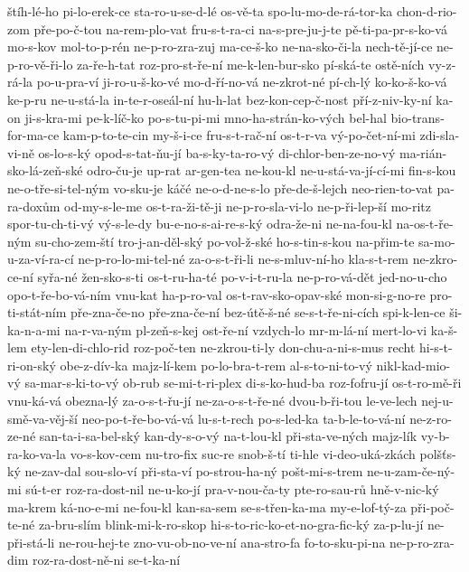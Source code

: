 štíh-lé-ho
pi-lo-erek-ce
sta-ro-u-se-d-lé
os-vě-ta
spo-lu-mo-de-rá-tor-ka
chon-d-rio-zom
pře-po-č-tou
na-rem-plo-vat
fru-s-t-ra-ci
na-s-pre-ju-j-te
pě-ti-pa-pr-s-ko-vá
mo-s-kov
mol-to-p-rén
ne-p-ro-zra-zuj
ma-ce-š-ko
ne-na-sko-či-la
nech-tě-jí-ce
ne-p-ro-vě-ři-lo
za-ře-h-tat
roz-pro-st-ře-ní
me-k-len-bur-sko
pí-ská-te
ostě-ních
vy-z-rá-la
po-u-pra-ví
ji-ro-u-š-ko-vé
mo-d-ří-no-vá
ne-zkrot-né
pí-ch-lý
ko-ko-š-ko-vá
ke-p-ru
ne-u-stá-la
in-te-r-oseál-ní
hu-h-lat
bez-kon-cep-č-nost
pří-z-niv-ky-ní
ka-on
ji-s-kra-mi
pe-k-líč-ko
po-s-tu-pi-mi
mno-ha-strán-ko-vých
bel-hal
bio-trans-for-ma-ce
kam-p-to-te-cin
my-š-i-ce
fru-s-t-rač-ní
os-t-r-va
vý-po-čet-ní-mi
zdi-sla-vi-ně
os-lo-s-ký
opod-s-tat-ňu-jí
ba-s-ky-ta-ro-vý
di-chlor-ben-ze-no-vý
ma-rián-sko-lá-zeň-ské
odro-ču-je
up-rat
ar-gen-tea
ne-kou-kl
ne-u-stá-va-jí-cí-mi
fin-s-kou
ne-o-tře-si-tel-ným
vo-sku-je
káčé
ne-o-d-ne-s-lo
pře-de-š-lejch
neo-rien-to-vat
pa-ra-doxům
od-my-s-le-me
os-t-ra-ži-tě-ji
ne-p-ro-sla-vi-lo
ne-p-ři-lep-ší
mo-ritz
spor-tu-ch-ti-vý
vý-s-le-dy
bu-e-no-s-ai-re-s-ký
odra-že-ni
ne-na-fou-kl
na-os-t-ře-ným
su-cho-zem-ští
tro-j-an-děl-ský
po-vol-ž-ské
ho-s-tin-s-kou
na-přim-te
sa-mo-u-za-ví-ra-cí
ne-p-ro-lo-mi-tel-né
za-o-s-t-ři-li
ne-s-mluv-ní-ho
kla-s-t-rem
ne-zkro-ce-ní
syřa-né
žen-sko-s-ti
os-t-ru-ha-té
po-v-i-t-ru-la
ne-p-ro-vá-dět
jed-no-u-cho
opo-t-ře-bo-vá-ním
vnu-kat
ha-p-ro-val
os-t-rav-sko-opav-ské
mon-si-g-no-re
pro-ti-stát-ním
pře-zna-če-no
pře-zna-če-ní
bez-útě-š-né
se-s-t-ře-ni-cích
spi-k-len-ce
ši-ka-n-a-mi
na-r-va-ným
pl-zeň-s-kej
ost-ře-ní
vzdych-lo
mr-m-lá-ní
mert-lo-vi
ka-š-lem
ety-len-di-chlo-rid
roz-poč-ten
ne-zkrou-ti-ly
don-chu-a-ni-s-mus
recht
hi-s-t-ri-on-ský
obe-z-dív-ka
majz-lí-kem
po-lo-bra-t-rem
al-s-to-ni-to-vý
nikl-kad-mio-vý
sa-mar-s-ki-to-vý
ob-rub
se-mi-t-ri-plex
di-s-ko-hud-ba
roz-fofru-jí
os-t-ro-mě-ři
vnu-ká-vá
obezna-lý
za-o-s-t-řu-jí
ne-za-o-s-t-ře-né
dvou-b-ři-tou
le-ve-lech
nej-u-smě-va-věj-ší
neo-po-t-ře-bo-vá-vá
lu-s-t-rech
po-s-led-ka
ta-b-le-to-vá-ní
ne-z-ro-ze-né
san-ta-i-sa-bel-ský
kan-dy-s-o-vý
na-t-lou-kl
při-sta-ve-ných
majz-lík
vy-b-ra-ko-va-la
vo-s-kov-cem
nu-tro-fix
suc-re
snob-š-tí
ti-hle
vi-deo-uká-zkách
polšťs-ký
ne-zav-dal
sou-slo-ví
při-sta-ví
po-strou-ha-ný
pošt-mi-s-trem
ne-u-zam-če-ný-mi
sú-t-er
roz-ra-dost-nil
ne-u-ko-jí
pra-v-nou-ča-ty
pte-ro-sau-rů
hně-v-nic-ký
ma-krem
ká-no-e-mi
ne-fou-kl
kan-sa-sem
se-s-třen-ka-ma
my-e-lof-tý-za
při-poč-te-né
za-bru-slím
blink-mi-k-ro-skop
hi-s-to-ric-ko-et-no-gra-fic-ký
za-p-lu-jí
ne-při-stá-li
ne-rou-hej-te
zno-vu-ob-no-ve-ní
ana-stro-fa
fo-to-sku-pi-na
ne-p-ro-zra-dim
roz-ra-dost-ně-ni
se-t-ka-ní
